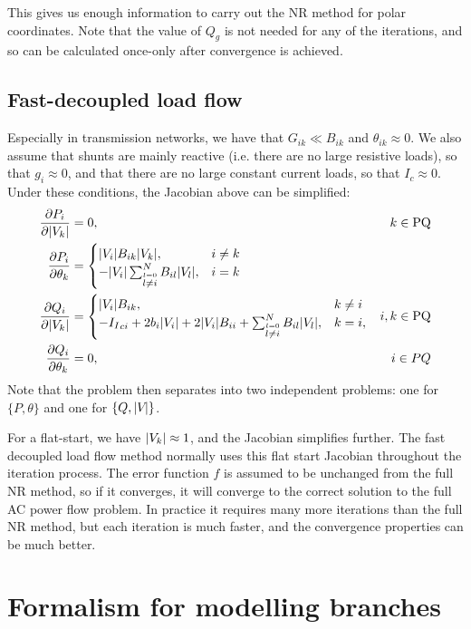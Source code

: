 \documentclass[11pt]{article}
\newcommand{\Ii}{{I_I}}
\begin{document}
This gives us enough information to carry out the NR method for polar coordinates. Note that the value of $Q_g$ is not needed for any of the iterations, and so can be calculated once-only after convergence is achieved.

\subsection{Fast-decoupled load flow}
Especially in transmission networks, we have that $G_{ik} \ll B_{ik}$ and $\theta_{ik} \approx 0$. We also assume that shunts are mainly reactive (i.e. there are no large resistive loads), so that $g_i \approx 0$, and that there are no large constant current loads, so that $I_c \approx 0$. Under these conditions, the Jacobian above can be simplified:
\begin{align}
	\frac{\partial P_i}{\partial \M{k}} &= 0, & k \in \text{PQ} \notag \\
	\frac{\partial P_i}{\partial \theta_k} &= 
		\begin{cases}
			\M{i}B_{ik}\M{k}, & i \ne k \\
			-\M{i}\sum_{\stackrel{l = 0}{l \ne i}}^NB_{il}\M{l}, &i = k
		\end{cases} \notag \\
	\frac{\partial Q_i}{\partial \M{k}} &= 
		\begin{cases}
			\M{i}B_{ik}, & k \ne i \\
			-\Ii_{ci} + 2b_i\M{i} + 2 \M{i}B_{ii} + \sum_{\stackrel{l = 0}{l \ne i}}^N{B_{il}\M{l}}, & k = i,
		\end{cases} & i, k \in \text{PQ} \notag \\
	\frac{\partial Q_i}{\partial \theta_k} &= 0, & i \in PQ
\end{align}
Note that the problem then separates into two independent problems: one for $\{P, \theta\}$ and one for $\{Q, |V_{}|\}$. 

For a flat-start, we have $|V_{k}| \approx 1$, and the Jacobian simplifies further. The fast decoupled load flow method normally uses this flat start Jacobian throughout the iteration process. The error function $f$ is assumed to be unchanged from the full NR method, so if it converges, it will converge to the correct solution to the full AC power flow problem. In practice it requires many more iterations than the full NR method, but each iteration is much faster, and the convergence properties can be much better.

\section{Formalism for modelling branches}
\end{document}
